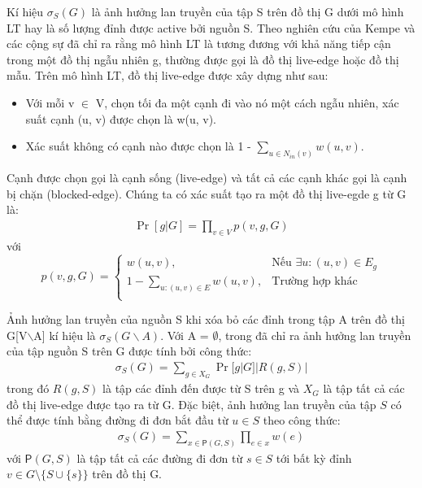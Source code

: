 Kí hiệu $\sigma_{S}(G)$ là ảnh hưởng lan truyền của tập S trên đồ thị G dưới mô hình LT hay là số lượng đỉnh được active bởi nguồn S. Theo nghiên cứu của Kempe và các cộng sự đã chỉ ra rằng mô hình LT là tương đương với khả năng tiếp cận trong một đồ thị ngẫu nhiên g, thường được gọi là đồ thị live-edge hoặc đồ thị mẫu. Trên mô hình LT, đồ thị live-edge được xây dựng như sau:
\begin {itemize}
\item Với mỗi v $\in$ V, chọn tối đa một cạnh đi vào nó một cách ngẫu nhiên, xác suất cạnh (u, v) được chọn là w(u, v).

\item Xác suất không có cạnh nào được chọn là 1 - $\sum_{u \in N_{in}(v)} w(u,v)$.
\end {itemize}

Cạnh được chọn gọi là cạnh sống (live-edge) và tất cả các cạnh khác gọi là cạnh bị chặn (blocked-edge). Chúng ta có xác suất tạo ra một đồ thị live-egde g từ G là:
\begin{align}
\Pr[g|G]=\prod_{v \in V}{p(v,g,G)}
\end{align}
với
\begin{equation}
p(v, g, G)= \left\{ \begin{array}{ll}
w(u, v), & \mbox{Nếu $\exists u: (u, v) \in E_g$}\\
1-\sum_{u:(u, v) \in E}{w(u, v)}, & \mbox{Trường hợp khác}\\
\end{array} \right.
\end{equation}

Ảnh hưởng lan truyền của nguồn S khi xóa bỏ các đỉnh trong tập A trên đồ thị G[V$\backslash$A] kí hiệu là $\sigma_{S}(G \backslash A)$. Với A = $\emptyset$, trong \cite{kemple1} đã chỉ ra ảnh hưởng lan truyền của tập nguồn S trên G được tính bởi công thức:
\begin{align}
\sigma_S(G)=\sum_{g \in X_G}{\Pr[g|G]|R(g, S)|}
\label{inf_cal}
\end{align}
trong đó $R(g, S)$ là tập các đỉnh đến được từ S trên g và $X_G$ là tập tất cả các đồ thị live-edge được tạo ra từ G. Đặc biệt, ảnh hưởng lan truyền của tập $S$ có thể được tính bằng đường đi đơn bắt đầu từ $u \in S$ theo công thức: 
\begin{align}
\sigma_{S}(G)=\sum_{x \in \mathsf{P}(G, S)} \prod_{e \in x}w(e)
\label{inf_path}
\end{align} 				
với $\mathsf{P}(G, S)$ là tập tất cả các đường đi đơn từ $s \in S$ tới bất kỳ đỉnh $v \in G \setminus \{S \cup \{s\} \} $ trên đồ thị G.		

